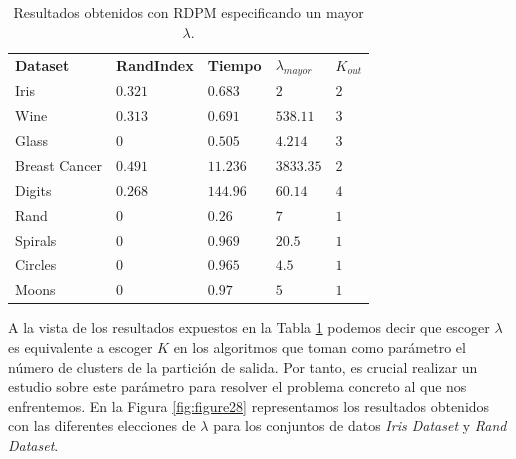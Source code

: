 \begin{table}[!h]
	\centering
	\setlength{\arrayrulewidth}{1mm}
	\setlength{\tabcolsep}{10pt}
	\renewcommand{\arraystretch}{0.85}
	
	\begin{tabular}{ >{\centering\arraybackslash}m{2.5cm}  >{\centering\arraybackslash}m{1.8cm}>{\centering\arraybackslash}m{1.5cm}>{\centering\arraybackslash}m{1cm}>{\centering\arraybackslash}m{1cm}}
		\hline
		\rowcolor{black}
		\multicolumn{5}{c}{\bf \color{white}{Resultados obtenidos con RDPM para un mayor $\lambda$}}\\
		\hline
		\rowcolor{gray!50}
		\textbf{Dataset} & \textbf{RandIndex} & \textbf{Tiempo} & \textbf{$\lambda_{mayor}$} & \textbf{$K_{out}$}  \\
		Iris & $0.321$ & $0.683$ & $2$ & $2$ \\
		Wine & $0.313$ & $0.691$ & $538.11$ & $3$ \\
		Glass & $0$ & $0.505$ & $4.214$ & $3$ \\
		Breast Cancer & $0.491$ & $11.236$ & $3833.35$ & $2$ \\
		Digits & $0.268$ & $144.96$ & $60.14$ & $4$ \\
		Rand & $0$ & $0.26$ & $7$ & $1$ \\
		Spirals & $0$ & $0.969$ & $20.5$ & $1$ \\
		Circles & $0$ & $0.965$ & $4.5$ & $1$  \\
		Moons & $0$ & $0.97$ & $5$ & $1$ \\
		\hline
		
	\end{tabular}
	\caption{Resultados obtenidos con \acs{RDPM} especificando un mayor $\lambda$.}
	\label{tab:tabla11}
\end{table}

A la vista de los resultados expuestos en la Tabla \ref{tab:tabla11} podemos decir que escoger $\lambda$ es equivalente a escoger $K$ en los algoritmos que toman como parámetro el número de clusters de la partición de salida. Por tanto, es crucial realizar un estudio sobre este parámetro para resolver el problema concreto al que nos enfrentemos. En la Figura \ref{fig:figure28} representamos los resultados obtenidos con las diferentes elecciones de $\lambda$ para los conjuntos de datos \textit{Iris Dataset} y \textit{Rand Dataset}. 

